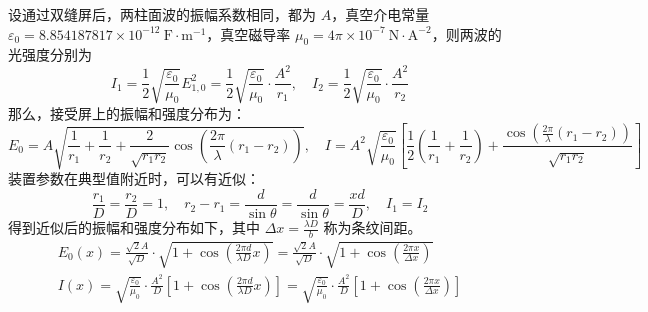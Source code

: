 \documentclass[UTF8]{report}
\theoremstyle{MyLineTheoremStyle} %
\theoremstyle{MyBlockTheoremStyle} %
\theoremstyle{MySubsubsectionStyle} %
\begin{document}
设通过双缝屏后，两柱面波的振幅系数相同，都为 $A$，真空介电常量 $\varepsilon_0 = 8.854187817 \times 10^{-12}\ \mathrm{F\cdot m^{-1}}$，真空磁导率 $\mu_0 = 4\pi \times 10^{-7}\ \mathrm{N\cdot A^{-2}}$，则两波的光强度分别为
\begin{equation}
    I_1 = \frac{1}{2}\sqrt{\frac{\varepsilon_0}{\mu_0}}E_{1,0}^2 = \frac{1}{2}\sqrt{\frac{\varepsilon_0}{\mu_0}} \cdot \frac{A^2}{r_1},\quad
    I_2 = \frac{1}{2}\sqrt{\frac{\varepsilon_0}{\mu_0}} \cdot \frac{A^2}{r_2}
\end{equation}
那么，接受屏上的振幅和强度分布为：
\begin{equation}
    E_0 = A \sqrt{ \frac{1}{r_1} + \frac{1}{r_2} + \frac{2}{\sqrt{r_1r_2}} \cos \left( \frac{2 \pi}{\lambda}(r_1 - r_2) \right)  }  ,\quad 
    I = A^2\sqrt{\frac{\varepsilon_0}{\mu_0}}\left[ \frac{1}{2}\left( \frac{1}{r_1} + \frac{1}{r_2} \right) + \frac{\cos \left( \frac{2 \pi}{\lambda}(r_1 - r_2) \right)}{\sqrt{r_1r_2} } \right]
\end{equation}
装置参数在典型值附近时，可以有近似：
\begin{equation}\label{杨氏双缝干涉近似}
\frac{r_1}{D} = \frac{r_2}{D} = 1,\quad r_2 - r_1 = \frac{d}{\sin \theta} = \frac{d}{\sin \theta} = \frac{x d}{ D },\quad I_1 = I_2
\end{equation}
得到近似后的振幅和强度分布如下，其中 $\Delta x= \frac{\lambda D}{b}$ 称为条纹间距。
\begin{gather}\label{杨氏双缝干涉近似结果}
    E_0(x) = \frac{\sqrt{2}A}{\sqrt{D}} \cdot \sqrt{1 + \cos \left( \frac{2 \pi d}{\lambda D}x \right)} = \frac{\sqrt{2}A}{\sqrt{D}} \cdot \sqrt{1 + \cos \left( \frac{2 \pi x}{\Delta x} \right)} \\ 
    I(x) = \sqrt{\frac{\varepsilon_0}{\mu_0}} \cdot \frac{A^2}{D} \left[ 1 + \cos \left( \frac{2 \pi  d}{\lambda D }x \right) \right] = \sqrt{\frac{\varepsilon_0}{\mu_0}} \cdot \frac{A^2}{D} \left[ 1 + \cos \left( \frac{2 \pi x}{\Delta x} \right) \right]
\end{gather}
\end{document}
